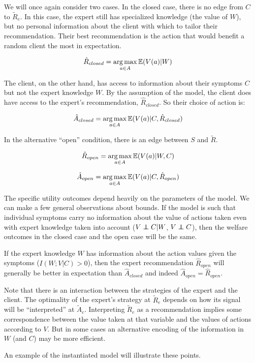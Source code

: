 \documentclass[../thesis.tex]{subfiles}
\begin{document}
We will once again consider two cases.
In the closed case, there is no edge from
$C$ to $\tilde{R}_e$.
In this case, the expert still has specialized knowledge
(the value of $W$), but no personal information about the
client with which to tailor their recommendation.
Their best recommendation is the action that would
benefit a random client the most in expectation.

$$\hat{R}_{closed} = \operatorname*{arg\,max}_{a \in A} \mathbb{E}(V(a) \vert W)$$

The client, on the other hand, has access to information
about their symptoms $C$ but not the expert knowledge $W$.
By the assumption of the model, the client does have access
to the expert's recommendation, $\hat{R}_{closed}$.
So their choice of action is:

$$\hat{A}_{closed} = \operatorname*{arg\,max}_{a \in A} \mathbb{E}(V(a) \vert C, \hat{R}_{closed})$$

In the alternative ``open'' condition, there is an edge between
$S$ and $\tilde{R}$.

$$\hat{R}_{open} = \operatorname*{arg\,max}_{a \in A} \mathbb{E}(V(a) \vert W,C)$$

$$\hat{A}_{open} = \operatorname*{arg\,max}_{a \in A} \mathbb{E}(V(a) \vert C, \hat{R}_{open})$$

The specific utility outcomes depend heavily on the parameters of
the model.
We can make a few general observations about bounds.
If the model is such that individual symptoms carry no
information about the value of actions taken even with expert
knowledge taken into account ($V \independent C \vert W$,
$V \independent C$),
then the welfare outcomes in the closed case and the open case will
be the same.

If the expert knowledge $W$ has information
about the action values given the symptoms ($I(W;V \vert C) > 0$),
then the expert recommendation $\hat{R}_{open}$ will generally be better
in expectation than $\hat{A}_{closed}$ and indeed
$\hat{A}_{open} = \hat{R}_{open}$.

Note that there is an interaction between the strategies of the
expert and the client.
The optimality of the expert's strategy at $\tilde{R}_e$ depends
on how its signal will be ``interpreted'' at $\tilde{A}_c$.
Interpreting $\tilde{R}_e$ as a recommendation implies some
correspondence between the value taken at that variable and
the values of actions according to $V$.
But in some cases an alternative encoding of the information
in $W$ (and $C$) may be more efficient.

An example of the instantiated model will illustrate these points.
\end{document}
